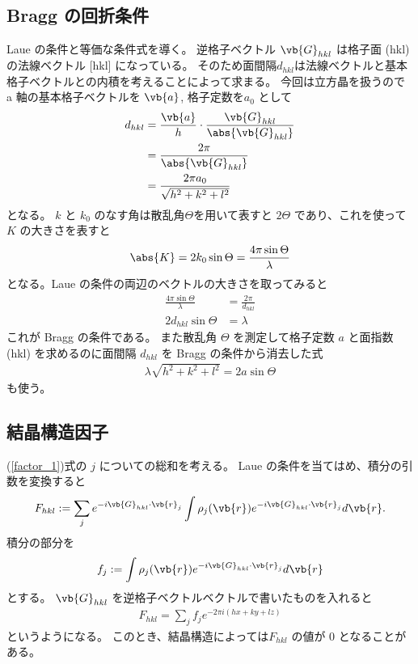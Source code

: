\documentclass[11pt,dvipdfmx,a4paper]{jsarticle}
\begin{document}
\subsection{Bragg の回折条件}
 Laue の条件と等価な条件式を導く。
逆格子ベクトル \(\vb{G}_{hkl}\) は格子面 (hkl) の法線ベクトル [hkl] になっている。
そのため面間隔\(d_{hkl}\)は法線ベクトルと基本格子ベクトルとの内積を考えることによって求まる。
今回は立方晶を扱うので a 軸の基本格子ベクトルを \(\vb{a}\), 格子定数を\(a_0\) として
\begin{align}
	d_{hkl} &= \frac{\vb{a}}{h} \cdot \frac{\vb{G}_{hkl}}{\abs{\vb{G}_{hkl}}}\\
	&= \frac{2\pi}{\abs{\vb{G}_{hkl}}} \label{eq:d-G}\\
	&= \frac{2\pi a_0}{\sqrt{h^2+k^2+l^2}}
\end{align}
となる。
\(k\) と \(k_0\) のなす角は散乱角\(\Theta\)を用いて表すと \(2\Theta\) であり、これを使って \(K\) の大きさを表すと
\begin{align}
	\abs{K} = 2k_0\sin\Theta = \frac{4\pi\sin\Theta}{\lambda}
\end{align}
となる。Laue の条件の両辺のベクトルの大きさを取ってみると
\begin{align}
	\frac{4\pi\sin\Theta}{\lambda} &= \frac{2\pi}{d_{hkl}}\\
	2d_{hkl} \sin\Theta &= \lambda
\end{align}
これが Bragg の条件である。
また散乱角 \(\Theta\) を測定して格子定数 \(a\) と面指数 (hkl) を求めるのに面間隔 \(d_{hkl}\) を Bragg の条件から消去した式
\begin{align}
	\lambda \sqrt{h^2+k^2+l^2}  = 2a \sin\Theta \label{eq:bragg}
\end{align}
も使う。

\subsection{結晶構造因子}
(\ref{factor_1})式の \(j\) についての総和を考える。
Laue の条件を当てはめ、積分の引数を変換すると
\begin{align}
	F_{hkl} := \sum_j e^{-i\vb{G}_{hkl}\cdot \vb{r}_j} \int \rho_j(\vb{r}) e^{-i\vb{G}_{hkl}\cdot \vb{r}_j}d\vb{r} .
\end{align}
積分の部分を
\begin{align}
	f_j :=\int \rho_j(\vb{r}) e^{-i\vb{G}_{hkl}\cdot \vb{r}_j} d\vb{r}
\end{align}
とする。
\(\vb{G}_{hkl}\) を逆格子ベクトルベクトルで書いたものを入れると
\begin{align}
	F_{hkl} = \sum_j f_j e^{-2\pi i (hx + ky + lz)}
\end{align}
というようになる。
このとき、結晶構造によっては\(F_{hkl}\) の値が 0 となることがある。
\end{document}
